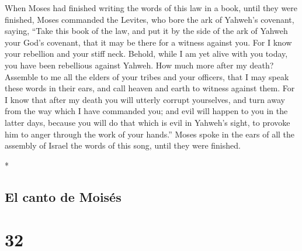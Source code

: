 \begin{paracol}{2}
\begin{otherlanguage}{english}
 When Moses had finished writing the words of this law in
a book, until they were finished,  Moses commanded the
Levites, who bore the ark of Yahweh's covenant, saying, 
``Take this book of the law, and put it by the side of the ark of Yahweh
your God's covenant, that it may be there for a witness against you.
 For I know your rebellion and your stiff neck. Behold,
while I am yet alive with you today, you have been rebellious against
Yahweh. How much more after my death?  Assemble to me all
the elders of your tribes and your officers, that I may speak these
words in their ears, and call heaven and earth to witness against them.
 For I know that after my death you will utterly corrupt
yourselves, and turn away from the way which I have commanded you; and
evil will happen to you in the latter days, because you will do that
which is evil in Yahweh's sight, to provoke him to anger through the
work of your hands.''  Moses spoke in the ears of all the
assembly of Israel the words of this song, until they were finished.

\end{otherlanguage}

\switchcolumn[0]*

\hypertarget{el-canto-de-moisuxe9s}{%
\subsection{El canto de Moisés}\label{el-canto-de-moisuxe9s}}

\hypertarget{section-62}{%
\section{32}\label{section-62}}


\end{paracol}
